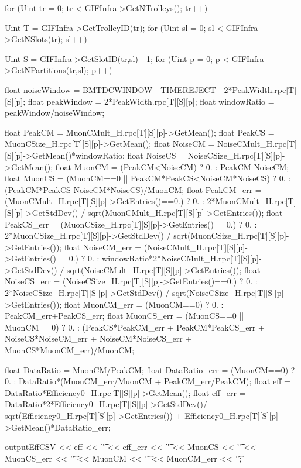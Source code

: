 	\begin{code}
	\begin{cppcode}
for (Uint tr = 0; tr < GIFInfra->GetNTrolleys(); tr++){
	Uint T = GIFInfra->GetTrolleyID(tr);
	for (Uint sl = 0; sl < GIFInfra->GetNSlots(tr); sl++){
		Uint S = GIFInfra->GetSlotID(tr,sl) - 1;
		for (Uint p = 0; p < GIFInfra->GetNPartitions(tr,sl); p++){
			float noiseWindow =
				BMTDCWINDOW - TIMEREJECT - 2*PeakWidth.rpc[T][S][p];
			float peakWindow = 2*PeakWidth.rpc[T][S][p];
			float windowRatio = peakWindow/noiseWindow;

			float PeakCM = MuonCMult_H.rpc[T][S][p]->GetMean();
			float PeakCS = MuonCSize_H.rpc[T][S][p]->GetMean();
			float NoiseCM = NoiseCMult_H.rpc[T][S][p]->GetMean()*windowRatio;
			float NoiseCS = NoiseCSize_H.rpc[T][S][p]->GetMean();
			float MuonCM = (PeakCM<NoiseCM) ? 0. : PeakCM-NoiseCM;
			float MuonCS = (MuonCM==0 || PeakCM*PeakCS<NoiseCM*NoiseCS)
				? 0.
				: (PeakCM*PeakCS-NoiseCM*NoiseCS)/MuonCM;
			float PeakCM_err = (MuonCMult_H.rpc[T][S][p]->GetEntries()==0.)
				? 0.
				: 2*MuonCMult_H.rpc[T][S][p]->GetStdDev() /
							sqrt(MuonCMult_H.rpc[T][S][p]->GetEntries());
			float PeakCS_err = (MuonCSize_H.rpc[T][S][p]->GetEntries()==0.)
				? 0.
				: 2*MuonCSize_H.rpc[T][S][p]->GetStdDev() /
							sqrt(MuonCSize_H.rpc[T][S][p]->GetEntries());
			float NoiseCM_err = (NoiseCMult_H.rpc[T][S][p]->GetEntries()==0.)
				? 0.
				: windowRatio*2*NoiseCMult_H.rpc[T][S][p]->GetStdDev() /
							sqrt(NoiseCMult_H.rpc[T][S][p]->GetEntries());
			float NoiseCS_err = (NoiseCSize_H.rpc[T][S][p]->GetEntries()==0.)
				? 0.
				: 2*NoiseCSize_H.rpc[T][S][p]->GetStdDev() /
							sqrt(NoiseCSize_H.rpc[T][S][p]->GetEntries());
			float MuonCM_err = (MuonCM==0) ? 0. : PeakCM_err+PeakCS_err;
			float MuonCS_err = (MuonCS==0 || MuonCM==0) ? 0.
				: (PeakCS*PeakCM_err + PeakCM*PeakCS_err +
					NoiseCS*NoiseCM_err + NoiseCM*NoiseCS_err +
					MuonCS*MuonCM_err)/MuonCM;

			float DataRatio = MuonCM/PeakCM;
			float DataRatio_err = (MuonCM==0) ? 0.
				: DataRatio*(MuonCM_err/MuonCM + PeakCM_err/PeakCM);
			float eff = DataRatio*Efficiency0_H.rpc[T][S][p]->GetMean();
			float eff_err =  DataRatio*2*Efficiency0_H.rpc[T][S][p]->GetStdDev()/
						sqrt(Efficiency0_H.rpc[T][S][p]->GetEntries()) +
						Efficiency0_H.rpc[T][S][p]->GetMean()*DataRatio_err;

			outputEffCSV << eff << '\t' << eff_err << '\t'
				<< MuonCS << '\t' << MuonCS_err << '\t'
				<< MuonCM << '\t' << MuonCM_err << '\t';
		}
	}
}
	\end{cppcode}
	\label{cpp:effcsv}
	\vspace{5mm}
	\end{code}

\clearpage{\pagestyle{empty}\cleardoublepage}